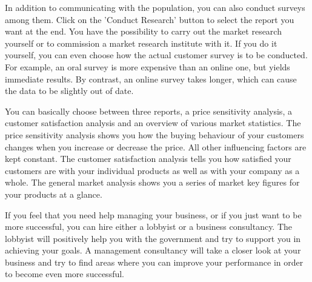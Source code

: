 In addition to communicating with the population, you can also conduct surveys among them. Click on the 'Conduct Research' button to select the report you want at the end. You have the possibility to carry out the market research yourself or to commission a market research institute with it. If you do it yourself, you can even choose how the actual customer survey is to be conducted. For example, an oral survey is more expensive than an online one, but yields immediate results.  By contrast, an online survey takes longer, which can cause the data to be slightly out of date.

You can basically choose between three reports, a price sensitivity analysis, a customer satisfaction analysis and an overview of various market statistics. The price sensitivity analysis shows you how the buying behaviour of your customers changes when you increase or decrease the price. All other influencing factors are kept constant. The customer satisfaction analysis tells you how satisfied your customers are with your individual products as well as with your company as a whole. The general market analysis shows you a series of market key figures for your products at a glance. 

If you feel that you need help managing your business, or if you just want to be more successful, you can hire either a lobbyist or a business consultancy. The lobbyist will positively help you with the government and try to support you in achieving your goals. 
A management consultancy will take a closer look at your business and try to find areas where you can improve your performance in order to become even more successful.